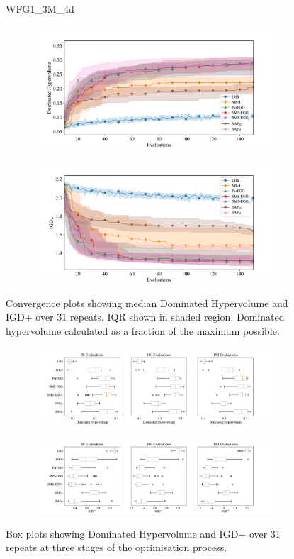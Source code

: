 \documentclass[conference]{IEEEtran}
\begin{document}
\begin{figure}
WFG1\_3M\_4d

\begin{subfigure}[hbt!]{\linewidth}

    \centering
    \includegraphics[width=0.7\linewidth]{figures/wfg1_3obj_4dim_hv_plot.pdf}
\end{subfigure}
\begin{subfigure}[h]{\linewidth}
    \centering
    \includegraphics[width=0.7\linewidth]{figures/wfg1_3obj_4dim_igd_plot.pdf}
\end{subfigure}
    \caption{Convergence plots showing median Dominated Hypervolume and IGD+ over 31 repeats. IQR shown in shaded region. Dominated hypervolume calculated as a fraction of the maximum possible.}
\vspace{\floatsep}
\begin{subfigure}[t]{\linewidth}
    \centering
    \includegraphics[width=0.8\linewidth]{figures/wfg1_3obj_4dim_hv_boxplot.pdf}
\end{subfigure}
\begin{subfigure}[t]{\linewidth}
    \centering
    \includegraphics[width=0.8\linewidth]{figures/wfg1_3obj_4dim_igd_boxplot.pdf}
\end{subfigure}
    \caption{Box plots showing Dominated Hypervolume and IGD+ over 31 repeats at three stages of the optimisation process.}
\end{figure}
\clearpage
\end{document}
